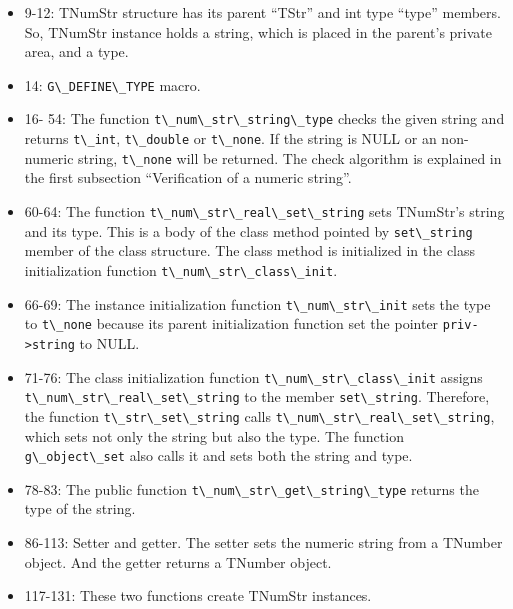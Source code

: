 \begin{itemize}
\tightlist
\item
  9-12: TNumStr structure has its parent ``TStr'' and int type ``type''
  members. So, TNumStr instance holds a string, which is placed in the
  parent's private area, and a type.
\item
  14: \passthrough{\lstinline!G\_DEFINE\_TYPE!} macro.
\item
  16- 54: The function
  \passthrough{\lstinline!t\_num\_str\_string\_type!} checks the given
  string and returns \passthrough{\lstinline!t\_int!},
  \passthrough{\lstinline!t\_double!} or
  \passthrough{\lstinline!t\_none!}. If the string is NULL or an
  non-numeric string, \passthrough{\lstinline!t\_none!} will be
  returned. The check algorithm is explained in the first subsection
  ``Verification of a numeric string''.
\item
  60-64: The function
  \passthrough{\lstinline!t\_num\_str\_real\_set\_string!} sets
  TNumStr's string and its type. This is a body of the class method
  pointed by \passthrough{\lstinline!set\_string!} member of the class
  structure. The class method is initialized in the class initialization
  function \passthrough{\lstinline!t\_num\_str\_class\_init!}.
\item
  66-69: The instance initialization function
  \passthrough{\lstinline!t\_num\_str\_init!} sets the type to
  \passthrough{\lstinline!t\_none!} because its parent initialization
  function set the pointer \passthrough{\lstinline!priv->string!} to
  NULL.
\item
  71-76: The class initialization function
  \passthrough{\lstinline!t\_num\_str\_class\_init!} assigns
  \passthrough{\lstinline!t\_num\_str\_real\_set\_string!} to the member
  \passthrough{\lstinline!set\_string!}. Therefore, the function
  \passthrough{\lstinline!t\_str\_set\_string!} calls
  \passthrough{\lstinline!t\_num\_str\_real\_set\_string!}, which sets
  not only the string but also the type. The function
  \passthrough{\lstinline!g\_object\_set!} also calls it and sets both
  the string and type.
\item
  78-83: The public function
  \passthrough{\lstinline!t\_num\_str\_get\_string\_type!} returns the
  type of the string.
\item
  86-113: Setter and getter. The setter sets the numeric string from a
  TNumber object. And the getter returns a TNumber object.
\item
  117-131: These two functions create TNumStr instances.
\end{itemize}

